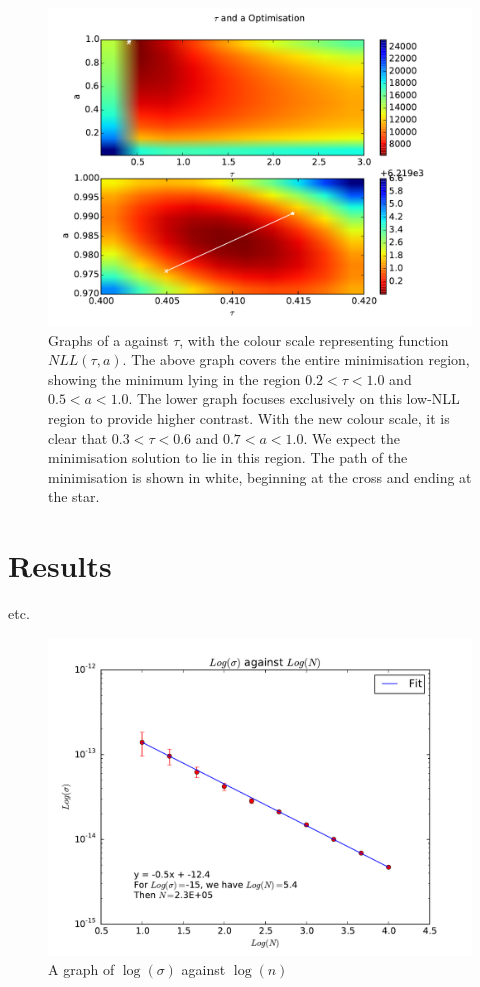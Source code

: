 \documentclass{article}
\begin{document}
\begin{figure}
\begin{center}
\includegraphics[height=0.3\textheight]{nll2d}
\caption{Graphs of a against $\tau$, with the colour scale representing function $NLL(\tau, a)$. The above graph covers the entire minimisation region, showing the minimum lying in the region $0.2 < \tau < 1.0$ and $0.5 < a < 1.0$. The lower graph focuses exclusively on this low-NLL region to provide higher contrast. With the new colour scale, it is clear that $0.3 < \tau < 0.6$ and $0.7 < a < 1.0$. We expect the minimisation solution to lie in this region. The path of the minimisation is shown in white, beginning at the cross and ending at the star.}
\label{fig:nll2d}
\end{center}
\end{figure}

\section{Results}

etc.

\begin{figure}
\begin{center}
\includegraphics[height=0.3\textheight]{nsigma}
\caption{A graph of $\log(\sigma)$ against $\log(n)$ }
\label{fig:nsigma}
\end{center}
\end{figure}
\end{document}
